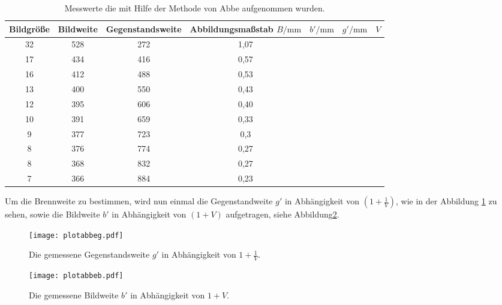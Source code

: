 \begin{table}
    \centering
    \caption{Messwerte die mit Hilfe der Methode von Abbe aufgenommen wurden.}
    \label{tab:abbe}
    \begin{tabular}{c c c c c c c}
    \toprule
    Bildgröße  & Bildweite &Gegenstandsweite & Abbildungsmaßstab
     $B/\si{\milli\meter}$ &$b'/\si{\milli\meter}$ & $g'/\si{\milli\meter}$ &$V$\\
    \midrule
    32  &  528  &  272  & 1,07\\
    17  &  434  &  416  & 0,57\\
    16  &  412  &  488  & 0,53\\
    13  &  400  &  550  & 0,43\\
    12  &  395  &  606  & 0,40\\
    10  &  391  &  659  & 0,33\\
    9   &  377  &  723  & 0,3\\
    8   &  376  &  774  & 0,27\\
    8   &  368  &  832  & 0,27\\
    7   &  366  &  884  & 0,23\\
    \bottomrule
  \end{tabular}
\end{table}
\FloatBarrier
Um die Brennweite zu bestimmen, wird nun einmal
die Gegenstandweite $g'$ in Abhängigkeit von
  $(1+ \frac{1}{V})$, wie in der  Abbildung \ref{fig:Plotg'} zu sehen,
sowie die Bildweite $b'$ in Abhängigkeit von
$(1+V)$ aufgetragen, siehe Abbildung\ref{fig:Plotb'}.


\begin{figure}
  \centering
  \texttt{[image: plotabbeg.pdf]}
  \caption{Die gemessene Gegenstandsweite $g'$ in Abhängigkeit von $1+\frac{1}{V}$.}
  \label{fig:Plotg'}
\end{figure}

\begin{figure}
 \centering
 \texttt{[image: plotabbeb.pdf]}
 \caption{Die gemessene Bildweite $b'$ in Abhängigkeit von $1+V$.}
 \label{fig:Plotb'}
\end{figure}
\FloatBarrier

